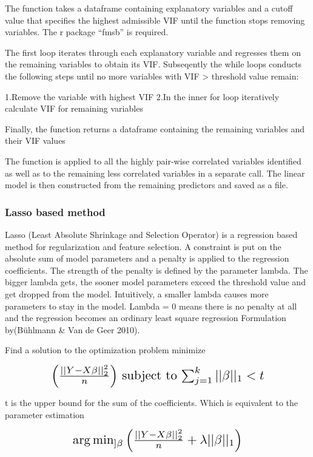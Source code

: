 \documentclass[11pt]{article}
\begin{document}
The function takes a dataframe containing explanatory variables and a cutoff value that specifies the highest admissible VIF until the function stops removing variables. The r package “fmsb” is required.

The first loop iterates through each explanatory variable and regresses them on the remaining variables
to obtain its VIF. Subseqently the while loops conducts the following steps until no more variables with
VIF > threshold value remain:

1.Remove the variable with highest VIF
2.In the inner for loop iteratively calculate VIF for remaining variables

Finally, the function returns a dataframe containing the remaining variables and their VIF values

The function is applied to all the highly pair-wise correlated variables identified  as well as to the remaining less correlated variables in a separate call. The linear model is then constructed from the remaining predictors and saved as a file.

\subsubsection{Lasso based method}

Lasso (Least Absolute Shrinkage and Selection Operator) is a regression based method for regularization and feature selection. A constraint is put on the absolute sum of model parameters and a penalty is applied to the regression coefficients. The strength of the penalty is defined by the parameter lambda. The bigger lambda gets, the sooner model parameters exceed the threshold value and get dropped from the model. Intuitively, a smaller lambda causes more parameters to stay in the model. Lambda = 0 means there is no penalty at all and the regression becomes an ordinary least square regression
Formulation by(Bühlmann \& Van de Geer 2010).

Find a solution to the optimization problem 
minimize 
\begin{center}  \[ \scalebox{1.5} {$\left ( \frac{||Y-X\beta ||^2_2}{n} \right )$ subject to  $\sum_{j=1}^{k} ||\beta ||_1<t$}\] \end{center} 

t is the upper bound for the sum of the coefficients.
Which is equivalent to the parameter estimation \\ 
\begin{center}  \[ \scalebox{1.5} {$\arg \min_{]\beta}\left (\frac{||Y-X\beta||_{2}^2}{n} +\lambda ||\beta ||_{1} \right ) $}\] \end{center} 
\end{document}
